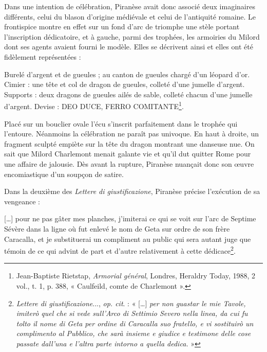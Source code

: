 \documentclass[12pt,twoside,openany]{book}
\renewenvironment{quote}
  {%
    \par\begingroup
    \fontsize{11pt}{14pt}\selectfont
    \list{}{\leftmargin=1.5em\rightmargin=1.5em}%
    \item\relax
  }
  {%
    \endlist
    \endgroup
  }
\newenvironment{PurhBlockQuote}
  {%
    \begin{quote}
  }
  {%
    \end{quote}
  }
\begin{document}
Dans une intention de célébration, Piranèse avait donc associé deux imaginaires différents, celui du blason d’origine médiévale et celui de l’antiquité romaine. Le frontispice montre en effet sur un fond d’arc de triomphe une stèle portant l’inscription dédicatoire, et à gauche, parmi des trophées, les armoiries du Milord dont ses agents avaient fourni le modèle. Elles se décrivent ainsi et elles ont été fidèlement représentées :

\begin{PurhBlockQuote}
Burelé d’argent et de gueules ; au canton de gueules chargé d’un léopard d’or. Cimier : une tête et col de dragon de gueules, colleté d’une jumelle d’argent. Supports : deux dragons de gueules ailés de sable, colleté chacun d’une jumelle d’argent. Devise : DEO DUCE, FERRO COMITANTE\footnote{Jean-Baptiste Rietstap, \textit{Armorial général}, Londres, Heraldry Today, 1988, 2 vol., t. 1, p. 388, « Caulfeild, comte de Charlemont ».}.
\end{PurhBlockQuote}

Placé sur un bouclier ovale l’écu s’inscrit parfaitement dans le trophée qui l’entoure. Néanmoins la célébration ne paraît pas univoque. En haut à droite, un fragment sculpté empiète sur la tête du dragon montrant une danseuse nue. On sait que Milord Charlemont menait galante vie et qu’il dut quitter Rome pour une affaire de jalousie. Dès avant la rupture, Piranèse nuançait donc son œuvre encomiastique d’un soupçon de satire.

Dans la deuxième des \textit{Lettere di giustificazione}, Piranèse précise l’exécution de sa vengeance :

\begin{PurhBlockQuote}
[…] pour ne pas gâter mes planches, j’imiterai ce qui se voit sur l’arc de Septime Sévère dans la ligne où fut enlevé le nom de Geta sur ordre de son frère Caracalla, et je substituerai un compliment au public qui sera autant juge que témoin de ce qui advint de part et d’autre relativement à cette dédicace\footnote{\textit{Lettere di giustificazione}..., \textit{op. cit}. : « […] \textit{per non guastar le mie Tavole, imiterò quel che si vede sull’Arco di Settimio Severo nella linea, da cui fu tolto il nome di Geta per ordine di Caracalla suo fratello, e vi sostituirò un complimento al Pubblico, che sarà insieme e giudice e testimone delle cose passate dall’una e l’altra parte intorno a quella dedica.} »}.
\end{PurhBlockQuote}
\end{document}
